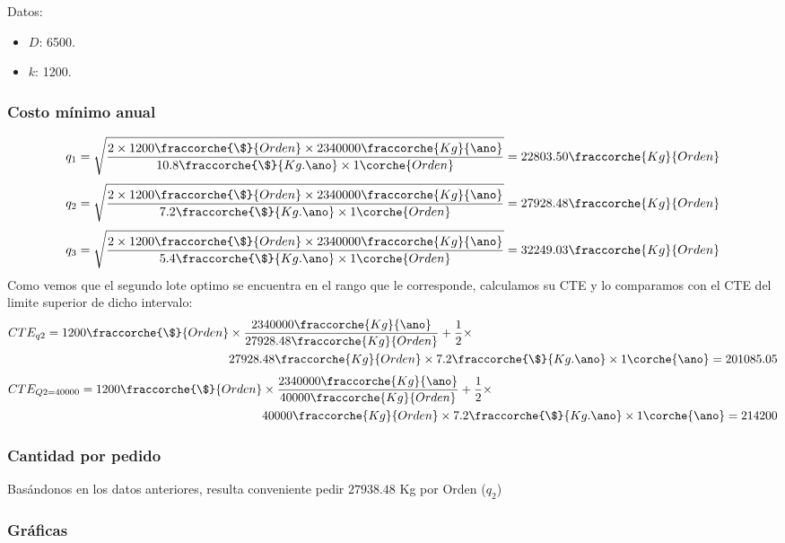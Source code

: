 \begin{homeworkProblem}
Datos:
\begin{itemize}
    \item $D$: 6500.
    \item $k$: 1200.
\end{itemize}
\subsubsection{Costo mínimo anual}
\begin{align*}
    q_1=\sqrt{
        \frac{
            2\times 1200\fraccorche{\$}{Orden}\times 2340000\fraccorche{Kg}{\ano}
            }{
                10.8\fraccorche{\$}{Kg.\ano}\times 1\corche{Orden}
            }
        }
        =
        22803.50\fraccorche{Kg}{Orden}
\end{align*}
\begin{align*}
    q_2=\sqrt{
        \frac{
            2\times 1200\fraccorche{\$}{Orden}\times 2340000\fraccorche{Kg}{\ano}
            }{
                7.2\fraccorche{\$}{Kg.\ano}\times 1\corche{Orden}
            }
        }
        =
        27928.48\fraccorche{Kg}{Orden}
\end{align*}
\begin{align*}
    q_3=\sqrt{
        \frac{
            2\times 1200\fraccorche{\$}{Orden}\times 2340000\fraccorche{Kg}{\ano}
            }{
                5.4\fraccorche{\$}{Kg.\ano}\times 1\corche{Orden}
            }
        }
        =
        32249.03\fraccorche{Kg}{Orden}
\end{align*}
Como vemos que el segundo lote optimo se encuentra en el rango que le corresponde, calculamos su CTE y lo comparamos con el CTE del limite superior de dicho intervalo:
\begin{align*}
    CTE_{q2} = 1200\fraccorche{\$}{Orden}&\times \frac{2340000\fraccorche{Kg}{\ano}}{27928.48\fraccorche{Kg}{Orden}}  + \frac{1}{2}\times \\ & 27928.48\fraccorche{Kg}{Orden}\times 7.2\fraccorche{\$}{Kg.\ano}\times 1\corche{\ano}=201085.05
\end{align*}
\begin{align*}
    CTE_{Q2=40000} = 1200\fraccorche{\$}{Orden}&\times \frac{2340000\fraccorche{Kg}{\ano}}{40000\fraccorche{Kg}{Orden}}  + \frac{1}{2}\times \\ & 40000\fraccorche{Kg}{Orden}\times 7.2\fraccorche{\$}{Kg.\ano}\times 1\corche{\ano}=214200
\end{align*}

\subsubsection{Cantidad por pedido}
Basándonos en los datos anteriores, resulta conveniente pedir $27938.48$ Kg por Orden ($q_2$)

\subsubsection{Gráficas}
\end{homeworkProblem}